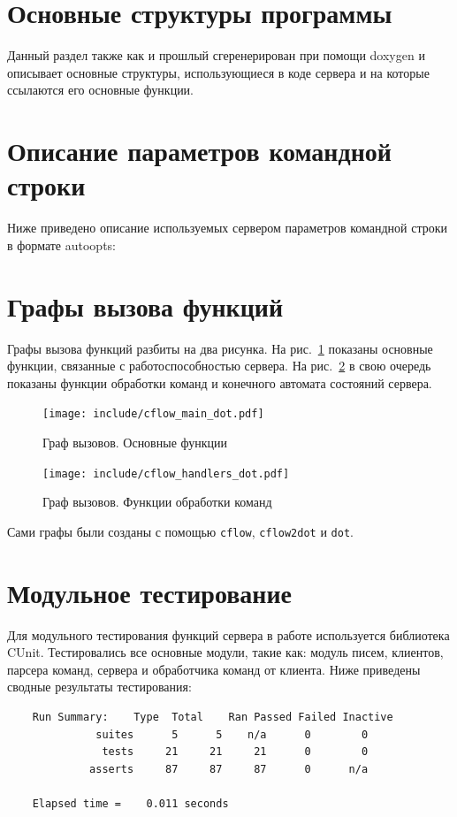 \documentclass[a4paper,12pt]{report}
\begin{document}
\section{Основные структуры программы}

Данный раздел также как и прошлый сгеренерирован при помощи doxygen и описывает основные структуры, использующиеся в коде сервера и на которые ссылаются его основные функции.







\section{Описание параметров командной строки}

Ниже приведено описание используемых сервером параметров командной строки в формате autoopts:




\section{Графы вызова функций}

Графы вызова функций разбиты на два рисунка. На рис.~\ref{fig:cflow1} показаны основные функции, связанные с работоспособностью сервера. На рис.~\ref{fig:cflow2} в свою очередь показаны функции обработки команд и конечного автомата состояний сервера.

\begin{figure}[h]
\texttt{[image: include/cflow\_main\_dot.pdf]}
\caption{Граф вызовов. Основные функции}
\label{fig:cflow1}
\end{figure}

\begin{figure}[h]
\centering
\texttt{[image: include/cflow\_handlers\_dot.pdf]}
\caption{Граф вызовов. Функции обработки команд}
\label{fig:cflow2}
\end{figure}

Сами графы были созданы с помощью \texttt{cflow}, \texttt{cflow2dot} и \texttt{dot}.


\section{Модульное тестирование}

Для модульного тестирования функций сервера в работе используется библиотека CUnit. Тестировались все основные модули, такие как: модуль писем, клиентов, парсера команд, сервера и обработчика команд от клиента. Ниже приведены сводные результаты тестирования:
\begin{verbatim}
    Run Summary:    Type  Total    Ran Passed Failed Inactive
              suites      5      5    n/a      0        0
               tests     21     21     21      0        0
             asserts     87     87     87      0      n/a

    Elapsed time =    0.011 seconds
\end{verbatim}
\end{document}
